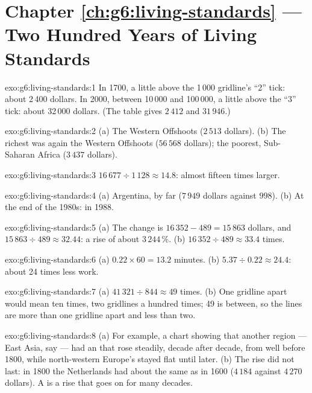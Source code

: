 \section*{Chapter \ref{ch:g6:living-standards} --- Two Hundred Years of Living Standards}

\begin{solution}{exo:g6:living-standards:1}
In 1700, a little above the 1\,000 gridline's ``2'' tick: about 2\,400 dollars.
In 2000, between 10\,000 and 100\,000, a little above the ``3'' tick: about
32\,000 dollars. (The table gives $2\,412$ and $31\,946$.)
\end{solution}

\begin{solution}{exo:g6:living-standards:2}
(a) The Western Offshoots ($2\,513$ dollars). (b) The richest was again the
Western Offshoots ($56\,568$ dollars); the poorest, Sub-Saharan Africa
($3\,437$ dollars).
\end{solution}

\begin{solution}{exo:g6:living-standards:3}
$16\,677 \div 1\,128 \approx 14.8$: almost fifteen times larger.
\end{solution}

\begin{solution}{exo:g6:living-standards:4}
(a) Argentina, by far ($7\,949$ dollars against $998$). (b) At the end of the
1980s: in 1988.
\end{solution}

\begin{solution}{exo:g6:living-standards:5}
(a) The change is $16\,352 - 489 = 15\,863$ dollars, and $15\,863 \div 489 \approx
32.44$: a rise of about $3\,244\,\%$. (b) $16\,352 \div 489 \approx 33.4$ times.
\end{solution}

\begin{solution}{exo:g6:living-standards:6}
(a) $0.22 \times 60 = 13.2$ minutes. (b) $5.37 \div 0.22 \approx 24.4$: about
24 times less work.
\end{solution}

\begin{solution}{exo:g6:living-standards:7}
(a) $41\,321 \div 844 \approx 49$ times. (b) One gridline apart would mean ten
times, two gridlines a hundred times; 49 is between, so the lines are more than
one gridline apart and less than two.
\end{solution}

\begin{solution}{exo:g6:living-standards:8}
(a) For example, a chart showing that another region --- East Asia, say ---
had an  that rose steadily, decade after decade, from well
before 1800, while north-western Europe's stayed flat until later. (b) The rise
did not last: in 1800 the Netherlands had about the same  as in
1600 ($4\,184$ against $4\,270$ dollars). A  is a rise that goes on for
many decades.
\end{solution}

